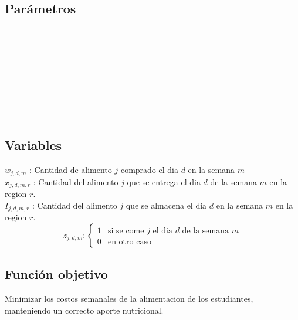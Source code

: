 \documentclass[letterpaper]{article}
\begin{document}
    
    \subsection{Parámetros}
    
    \\
    
    \\
    
    \\
    
    \\

    \\

    \\
    
    \\

    \\
    
    \subsection{Variables}

    $w_{j,d,m}$ : Cantidad de alimento $j$ comprado el dia $d$ en la semana $m$\\
    
    $x_{j,d,m,r}$ : Cantidad del alimento $j$ que se entrega el dia $d$ de la semana $m$ en la region $r$. \\

    
    $I_{j,d,m,r}$ : Cantidad del alimento $j$ que se almacena el dia $d$ en la semana $m$ en la region $r$. \\

    \[
    z_{j,d,m}:
    \begin{cases}
        1 & \text{si se come $j$ el dia $d$ de la semana $m$} \\
        0 & \text{en otro caso}
    \end{cases}
    \]

    
    \subsection{Función objetivo}
    Minimizar los costos semanales de la alimentacion de los estudiantes, manteniendo un correcto aporte nutricional.
\end{document}
